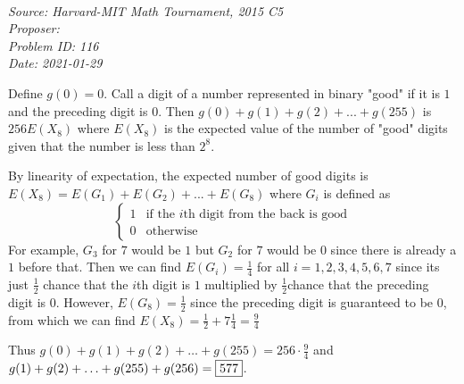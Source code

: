   
\SSbreak\\
\emph{Source: Harvard-MIT Math Tournament, 2015 C5}\\
\emph{Proposer: \Pchan}\\
\emph{Problem ID: 116}\\
\emph{Date: 2021-01-29}\\
\SSbreak

\bigskip

\begin{solution}\hfil\medskip
  
  Define $g(0) = 0$. Call a digit of a number represented in binary "good" if it is $1$ and the preceding digit is $0$. Then $g(0)+ g(1) + g(2) + ... + g(255)$ is $256 E(X_8)$ where $E(X_8)$ is the expected value of the number of "good" digits given that the number is less than $2^8$. 

  By linearity of expectation, the expected number of good digits is $E(X_8) = E(G_1)+E(G_2) + ... + E(G_8)$ where $G_i$ is defined as 
  \begin{equation*}
      \begin{cases}
      1 & \text{if the $i$th digit from the back is good}\\
      0 & \text{otherwise}
      \end{cases}
  \end{equation*}
  For example, $G_3$ for $7$ would be $1$ but $G_2$ for $7$ would be $0$ since there is already a $1$ before that. Then we can find $E(G_i) = \frac14$ for all $i = 1,2,3,4,5,6,7$ since its just $\frac 12$ chance that the $i$th digit is $1$ multiplied by $\frac 12$chance that the preceding digit is $0$. However, $E(G_8) = \frac 12$ since the preceding digit is guaranteed to be $0$, from which we can find $E(X_8) = \frac 12 + 7 \frac 14 = \frac 94$

Thus $g(0)+ g(1) + g(2) + \ldots + g(255) = 256 \cdot \frac94$ and $g(1) + g(2) + \ldots + g(255) + g(256) = \fbox{577}$.
\end{solution}\bigskip

